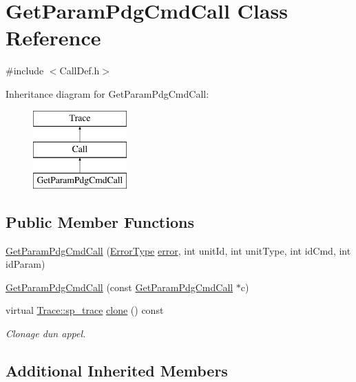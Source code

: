 \hypertarget{class_get_param_pdg_cmd_call}{}\section{Get\+Param\+Pdg\+Cmd\+Call Class Reference}
\label{class_get_param_pdg_cmd_call}


{\ttfamily \#include $<$Call\+Def.\+h$>$}

Inheritance diagram for Get\+Param\+Pdg\+Cmd\+Call\+:\begin{figure}[H]
\begin{center}
\leavevmode
\includegraphics[height=3.000000cm]{class_get_param_pdg_cmd_call}
\end{center}
\end{figure}
\subsection*{Public Member Functions}
\begin{DoxyCompactItemize}
\item 
\hyperlink{class_get_param_pdg_cmd_call_a26b970d28a2942b08bc9605ddc0b21ce}{Get\+Param\+Pdg\+Cmd\+Call} (\hyperlink{class_call_ade833a08ce215aaa4121102f3448c898}{Error\+Type} \hyperlink{class_call_a206f6150a8038fda48c17c2c7421aed1}{error}, int unit\+Id, int unit\+Type, int id\+Cmd, int id\+Param)
\item 
\hyperlink{class_get_param_pdg_cmd_call_aff03cad7f19271a5f07602f6a3b08201}{Get\+Param\+Pdg\+Cmd\+Call} (const \hyperlink{class_get_param_pdg_cmd_call}{Get\+Param\+Pdg\+Cmd\+Call} $\ast$c)
\item 
virtual \hyperlink{class_trace_a9c58e523529fc8a03fb6acf3eef86150}{Trace\+::sp\+\_\+trace} \hyperlink{class_get_param_pdg_cmd_call_a07b0bec23a831830746b25ca5d44b317}{clone} () const 
\begin{DoxyCompactList}\small\item\em Clonage d\textquotesingle{}un appel. \end{DoxyCompactList}\end{DoxyCompactItemize}
\subsection*{Additional Inherited Members}


